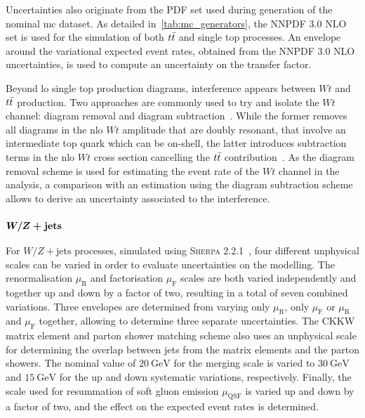  Uncertainties also originate from the \gls{PDF} set used during generation of the nominal \gls{mc} dataset.
 As detailed in~\cref{tab:mc_generators}, the \textsc{NNPDF 3.0 NLO} set is used for the simulation of both $t\bar{t}$ and single top processes.
 An envelope around the variational expected event rates, obtained from the \textsc{NNPDF 3.0 NLO} uncertainties, is used to compute an uncertainty on the transfer factor.
 
 Beyond \gls{lo} single top production diagrams, interference appears between $Wt$ and $t\bar{t}$ production.
 Two approaches are commonly used to try and isolate the $Wt$ channel: diagram removal and diagram subtraction~\cite{Frixione:2008yi}.
 While the former removes all diagrams in the \gls{nlo} $Wt$ amplitude that are doubly resonant, \ie that involve an intermediate top quark which can be on-shell, the latter introduces subtraction terms in the \gls{nlo} $Wt$ cross section cancelling the $t\bar{t}$ contribution~\cite{Frixione:2008yi}.
 As the diagram removal scheme is used for estimating the event rate of the $Wt$ channel in the analysis, a comparison with an estimation using the diagram subtraction scheme allows to derive an uncertainty associated to the interference.
  
 \subsubsection{$\makemebold{W/Z+\mathrm{jets}}$}
 
 For $W/Z+\mathrm{jets}$ processes, simulated using \textsc{Sherpa 2.2.1}~\cite{Gleisberg:2008ta,Bothmann:2019yzt}, four different unphysical scales can be varied in order to evaluate uncertainties on the modelling.
 The renormalisation $\mu_\mathrm{R}$ and factorisation $\mu_\mathrm{F}$ scales are both varied independently and together up and down by a factor of two, resulting in a total of seven combined variations.
 Three envelopes are determined from varying only $\mu_\mathrm{R}$, only $\mu_\mathrm{F}$ or $\mu_\mathrm{R}$ and $\mu_\mathrm{F}$ together, allowing to determine three separate uncertainties.
 The CKKW matrix element and parton shower matching scheme also uses an unphysical scale for determining the overlap between jets from the matrix elements and the parton showers.
 The nominal value of $\SI{20}{\GeV}$ for the merging scale is varied to $\SI{30}{\GeV}$ and $\SI{15}{\GeV}$ for the up and down systematic variations, respectively.
 Finally, the scale used for resummation of soft gluon emission $\mu_\mathrm{QSF}$ is varied up and down by a factor of two, and the effect on the expected event rates is determined.
 
